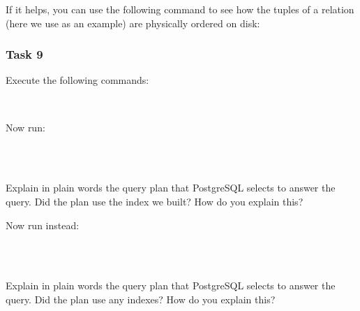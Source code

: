 \vgap

\noindent If it helps, you can use the following command to see how the tuples of a relation (here we use  as an example) are physically ordered on disk:

\vgap

\noindent {}

\subsubsection{Task 9}

Execute the following commands:

\vgap

\noindent {} \\
\noindent {}

\vgap

\noindent Now run:

\vgap

\noindent {} \\
 \\

\vgap

\noindent Explain in plain words the query plan that PostgreSQL selects to answer the query. Did the plan use the index  we built? How do you explain this?

\vgap

\noindent Now run instead:

\vgap

\noindent {} \\
 \\

\vgap

\noindent Explain in plain words the query plan that PostgreSQL selects to answer the query. Did the plan use any indexes? How do you explain this?

\vgap


\vgap

\noindent {}

